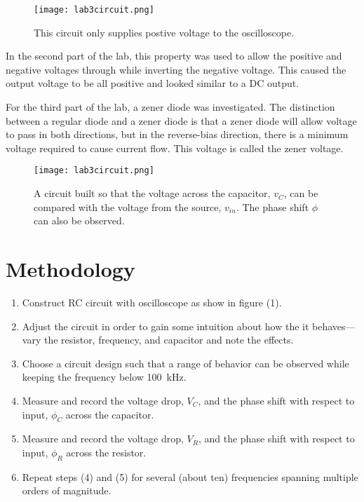 \documentclass[twocolumn, amsmath]{revtex4}
\begin{document}
\begin{figure}
    \texttt{[image: lab3circuit.png]}  
    \caption{This circuit only supplies postive voltage to the oscilloscope.}
\end{figure}

In the second part of the lab, this property was used to allow the positive and negative voltages through while inverting the negative voltage. This caused the output voltage to be all positive and looked similar to a DC output.

For the third part of the lab, a zener diode was investigated. The distinction between a regular diode and a zener diode is that a zener diode will allow voltage to pass in both directions, but in the reverse-bias direction, there is a minimum voltage required to cause current flow. This voltage is called the zener voltage.




\begin{figure}
    \texttt{[image: lab3circuit.png]}  
    \caption{A circuit built so that the voltage across the capacitor, $v_C$, can be compared with the voltage from the source, $v_{in}$. The phase shift $\phi$ can also be observed.}
\end{figure}



\section{Methodology}

\begin{enumerate}
    \item Construct RC circuit with oscilloscope as show in figure (1).
    \item Adjust the circuit in order to gain some intuition about how the it behaves--- vary the resistor, frequency, and capacitor and note the effects. 
    \item Choose a circuit design such that a range of behavior can be observed while keeping the frequency below \SI{100}{\kilo\hertz}.
    \item Measure and record the voltage drop, $V_C$, and the phase shift with respect to input, $\phi_C$ across the capacitor. 
    \item Measure and record the voltage drop, $V_R$, and the phase shift with respect to input, $\phi_R$ across the resistor. 
    \item Repeat steps (4) and (5) for several (about ten) frequencies spanning multiple orders of magnitude.
\end{enumerate}
\end{document}
